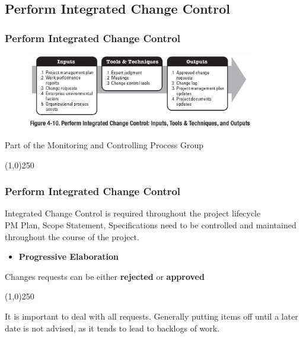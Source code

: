 \subsection{Perform Integrated Change Control}



\begin{frame}
\frametitle{Perform Integrated Change Control}
\begin{figure}
	\centering
		\includegraphics[width = 10cm]{images/Fig4-10.jpg}
	\label{fig:4-10}
\end{figure}Part of the Monitoring and Controlling Process Group
\end{frame}\begin{center}\line(1,0){250}\end{center}
%
%

\begin{frame}
\frametitle{Perform Integrated Change Control}
Integrated Change Control is required throughout the project lifecycle\\
PM Plan, Scope Statement, Specifications need to be controlled and maintained throughout the course of the project.
\begin{itemize}
	\item \textbf{Progressive Elaboration}
\end{itemize}
Changes requests can be either \textbf{rejected} or \textbf{approved}
\end{frame}\begin{center}\line(1,0){250}\end{center}
It is important to deal with all requests.  Generally putting items off until a later date is not advised, as it tends to lead to backlogs of work.

%
%

